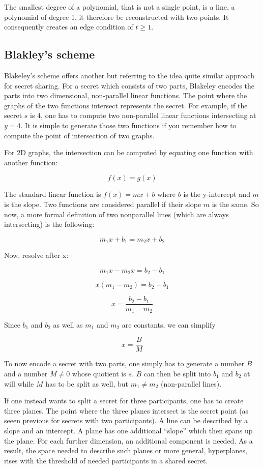 The smallest degree of a polynomial, that is not a single point, is a line, a
polynomial of degree 1, it therefore be reconstructed with two points. It
consequently creates an edge condition of $t \geq 1$.

\subsection{Blakley's scheme}

Blakeley's scheme offers another but referring to the idea quite similar
approach for secret sharing. For a secret which consists of two parts, 
Blakeley encodes the parts into two dimensional, non-parallel linear functions.
The point where the graphs of the two functions intersect represents the
secret. For example, if the secret $s$ is $4$, one has to compute two non-parallel
linear functions intersecting at $y = 4$. It is simple to generate those two
functions if you remember how to compute the point of intersection of two graphs.

For 2D graphs, the intersection can be computed by equating one function with
another function:

$$f(x) = g(x)$$

The standard linear function is $f(x) = mx + b$ where $b$ is the y-intercept and
$m$ is the slope. Two functions are considered parallel if their slope $m$ is 
the same. So now, a more formal definition of two nonparallel lines (which are
always intersecting) is the following:

$$m_1x + b_1 = m_2x + b_2$$

Now, resolve after x:

$$m_1x - m_2x = b_2 - b_1 $$

$$x (m_1 - m_2) = b_2 - b_1$$

$$x = \frac{b_2 - b_1}{m_1 - m_2}$$

Since $b_1$ and $b_2$ as well as $m_1$ and $m_2$ are constants, we can simplify

$$x = \frac{B}{M}$$

To now encode a secret with two parts, one simply has to generate a number $B$
and a number $M \neq 0$ whose quotient is $s$.
$B$ can then be split into $b_1$ and $b_2$ at will
while $M$ has to be split as well, but $m_1 \neq m_2$ (non-parallel lines).

If one instead wants to split a secret for three participants, one has to
create three planes. The point where the three planes intersect
is the secret point (as seeen previous for secrets with two participants).
A line can be described by a slope and an intercept. A plane has one
additional ``slope'' which then spans up the plane. For each further
dimension, an additional component is needed. As a result, the space needed
to describe such planes or more general, hyperplanes, rises with the
threshold of needed participants in a shared secret.

